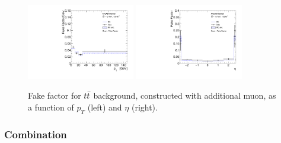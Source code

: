 \begin{figure}[!htb]
  \centering
  \includegraphics[width=0.42\textwidth]{figures/VBSZZ/fakebkg/Muon_2Dff_ptttbarFakeFactorAddMuon_etapt_pavgy.pdf}
  \includegraphics[width=0.42\textwidth]{figures/VBSZZ/fakebkg/Muon_2Dff_etattbarFakeFactorAddMuon_etapt_pavgx.pdf}
  \caption{Fake factor for $t\bar{t}$ background, constructed with additional muon, as a function of $p_{T}$ (left) and $\eta$ (right).}
  \label{fig:fake_tt_mu}
\end{figure}

\subsubsection{Combination}

